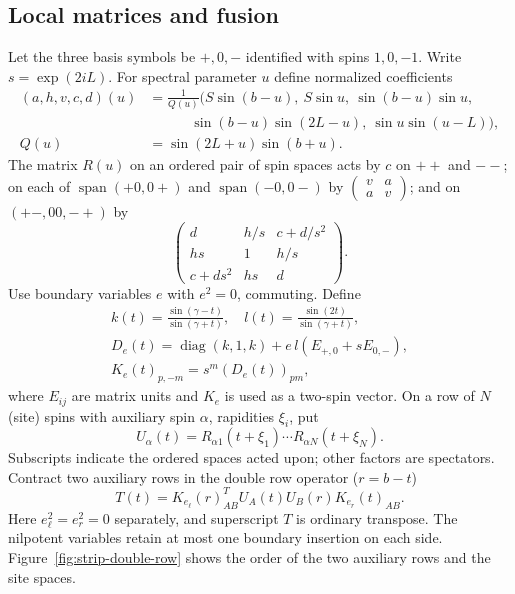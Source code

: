 \subsection{Local matrices and fusion}\label{sec:strip-local-identities}
Let the three basis symbols be $+,0,-$ identified with spins $1,0,-1$. Write $s=\exp(2iL)$. For spectral parameter $u$ define normalized coefficients
\[
 \begin{aligned}
 (a,h,v,c,d)(u)&=\frac{1}{Q(u)}
 \big(S\sin(b-u),\ S\sin u,\ \sin(b-u)\sin u,\;\\
 &\hspace{3em}\sin(b-u)\sin(2L-u),\ \sin u\sin(u-L)\big),\\
 Q(u)&=\sin(2L+u)\sin(b+u).
 \end{aligned}
\]
The matrix $R(u)$ on an ordered pair of spin spaces acts by $c$ on $++$ and $--$; on each of $\operatorname{span}(+0,0+)$ and $\operatorname{span}(-0,0-)$ by $\left(\begin{smallmatrix}v&a\\a&v\end{smallmatrix}\right)$; and on $(+-,00,-+)$ by
\[
 \begin{pmatrix}
 d&h/s&c+d/s^2\\ h s&1&h/s\\ c+d s^2&h s&d
 \end{pmatrix}.
\]
Use boundary variables $e$ with $e^2=0$, commuting. Define
\[
 \begin{gathered}
 k(t)=\frac{\sin(\gamma-t)}{\sin(\gamma+t)},\quad
 l(t)=\frac{\sin(2t)}{\sin(\gamma+t)},\\
 D_e(t)=\operatorname{diag}(k,1,k)+ e\,l(E_{+,0}+s E_{0,-}),\\
 K_e(t)_{p,-m}=s^m (D_e(t))_{p m},
 \end{gathered}
\]
where $E_{ij}$ are matrix units and $K_e$ is used as a two-spin vector. On a row of $N$ (site) spins with auxiliary spin $\alpha$, rapidities $\xi_i$, put
\[
 U_\alpha(t)=R_{\alpha 1}(t+\xi_1)\cdots R_{\alpha N}(t+\xi_N).
\]
Subscripts indicate the ordered spaces acted upon; other factors are spectators. Contract two auxiliary rows in the double row operator ($r=b-t$)
\[
 T(t) = K_{e_\ell}(r)_{AB}^{T} U_A(t) U_B(r) K_{e_r}(t)_{AB}.
\]
Here $e_\ell^2=e_r^2=0$ separately, and superscript $T$ is ordinary transpose. The nilpotent variables retain at most one boundary insertion on each side. Figure~\ref{fig:strip-double-row} shows the order of the two auxiliary rows and the site spaces.



